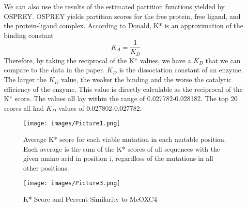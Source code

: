\documentclass[12pt]{extarticle}
\begin{document}
 We can also use the results of the estimated partition functions yielded by OSPREY. OSPREY yields partition scores for the free protein, free ligand, and the protein-ligand complex. According to {Donald}, 
 K* is an approximation of the binding constant \begin{equation}
     K_A = \frac{1}{K_D}
 \end{equation}
 Therefore, by taking the reciprocal of the K* values, we have a $K_D$ that we can compare to the data in the paper. $K_D$ is the dissociation constant of an enzyme. The larger the $K_D$ value, the weaker the binding and the worse the catalytic efficiency of the enzyme. This value is directly calculable as the reciprocal of the K* score. The values all lay within the range of 0.027782-0.028182. The top 20 scores all had $K_D$ values of 0.027802-0.027782.
 \begin{figure}
    \centering
    \texttt{[image: images/Picture1.png]}
    \caption{Average K* score for each viable mutation in each mutable position. Each average is the sum of the K* scores of all sequences with the given amino acid in position i, regardless of the mutations in all other positions. }
    \label{fig:my_label}
\end{figure}
\begin{figure}
    \centering
    \texttt{[image: images/Picture3.png]}
    \caption{K* Score and Percent Similarity to MeOXC4}
    \label{fig:my_label}
\end{figure}
\newpage
\end{document}
